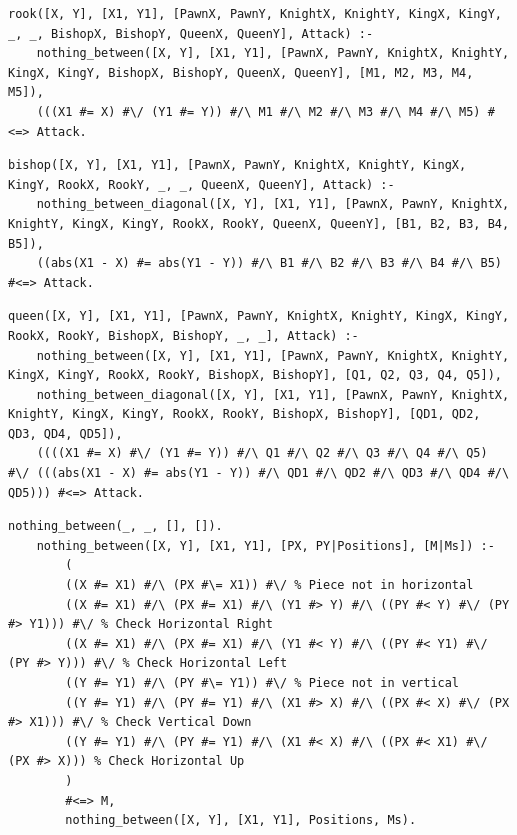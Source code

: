 \documentclass[runningheads]{llncs}
\begin{document}
\begin{lstlisting}[caption={Rook Attack}]
    rook([X, Y], [X1, Y1], [PawnX, PawnY, KnightX, KnightY, KingX, KingY, _, _, BishopX, BishopY, QueenX, QueenY], Attack) :-
    nothing_between([X, Y], [X1, Y1], [PawnX, PawnY, KnightX, KnightY, KingX, KingY, BishopX, BishopY, QueenX, QueenY], [M1, M2, M3, M4, M5]),
    (((X1 #= X) #\/ (Y1 #= Y)) #/\ M1 #/\ M2 #/\ M3 #/\ M4 #/\ M5) #<=> Attack.
\end{lstlisting}

\begin{lstlisting}[caption={Bishop Attack}]
    bishop([X, Y], [X1, Y1], [PawnX, PawnY, KnightX, KnightY, KingX, KingY, RookX, RookY, _, _, QueenX, QueenY], Attack) :-
    nothing_between_diagonal([X, Y], [X1, Y1], [PawnX, PawnY, KnightX, KnightY, KingX, KingY, RookX, RookY, QueenX, QueenY], [B1, B2, B3, B4, B5]),
    ((abs(X1 - X) #= abs(Y1 - Y)) #/\ B1 #/\ B2 #/\ B3 #/\ B4 #/\ B5) #<=> Attack.
\end{lstlisting}

\begin{lstlisting}[caption={Queen Attack}]
    queen([X, Y], [X1, Y1], [PawnX, PawnY, KnightX, KnightY, KingX, KingY, RookX, RookY, BishopX, BishopY, _, _], Attack) :-
    nothing_between([X, Y], [X1, Y1], [PawnX, PawnY, KnightX, KnightY, KingX, KingY, RookX, RookY, BishopX, BishopY], [Q1, Q2, Q3, Q4, Q5]),
    nothing_between_diagonal([X, Y], [X1, Y1], [PawnX, PawnY, KnightX, KnightY, KingX, KingY, RookX, RookY, BishopX, BishopY], [QD1, QD2, QD3, QD4, QD5]),    
    ((((X1 #= X) #\/ (Y1 #= Y)) #/\ Q1 #/\ Q2 #/\ Q3 #/\ Q4 #/\ Q5) #\/ (((abs(X1 - X) #= abs(Y1 - Y)) #/\ QD1 #/\ QD2 #/\ QD3 #/\ QD4 #/\ QD5))) #<=> Attack.
\end{lstlisting}

\newpage
\begin{lstlisting}[caption={Nothing Between horizontal and vertical}]
    nothing_between(_, _, [], []).
    nothing_between([X, Y], [X1, Y1], [PX, PY|Positions], [M|Ms]) :-
        (
        ((X #= X1) #/\ (PX #\= X1)) #\/ % Piece not in horizontal
        ((X #= X1) #/\ (PX #= X1) #/\ (Y1 #> Y) #/\ ((PY #< Y) #\/ (PY #> Y1))) #\/ % Check Horizontal Right
        ((X #= X1) #/\ (PX #= X1) #/\ (Y1 #< Y) #/\ ((PY #< Y1) #\/ (PY #> Y))) #\/ % Check Horizontal Left
        ((Y #= Y1) #/\ (PY #\= Y1)) #\/ % Piece not in vertical
        ((Y #= Y1) #/\ (PY #= Y1) #/\ (X1 #> X) #/\ ((PX #< X) #\/ (PX #> X1))) #\/ % Check Vertical Down
        ((Y #= Y1) #/\ (PY #= Y1) #/\ (X1 #< X) #/\ ((PX #< X1) #\/ (PX #> X))) % Check Horizontal Up
        )
        #<=> M,
        nothing_between([X, Y], [X1, Y1], Positions, Ms).
\end{lstlisting}
\end{document}
